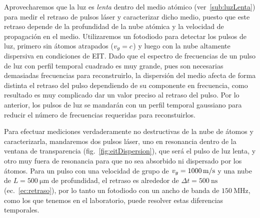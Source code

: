Aprovecharemos que la luz es \emph{lenta} dentro del medio atómico (ver~\ref{sub:luzLenta}) para medir el retraso de pulsos láser y caracterizar dicho medio, puesto que este retraso depende de la profundidad de la nube atómica y la velocidad de propagación en el medio. Utilizaremos un fotodiodo para detectar los pulsos de luz, primero sin átomos atrapados ($v_\sm{g}=c$) y luego con la nube altamente dispersiva en condiciones de EIT. Dado que el espectro de frecuencias de un pulso de luz con perfil temporal cuadrado es muy grande, pues son necesarias demasiadas frecuencias para reconstruirlo, la dispersión del medio afecta de forma distinta el retraso del pulso dependiendo de su componente en frecuencia, como resultado es muy complicado dar un valor preciso al retraso del pulso. Por lo anterior, los pulsos de luz se mandarán con un perfil temporal gaussiano para reducir el número de frecuencias requeridas para reconstuirlos.

\p Para efectuar mediciones verdaderamente no destructivas de la nube de átomos y caracterizarla, mandaremos dos pulsos láser, uno en resonancia dentro de la ventana de transparencia (fig.~\ref{fig:eitDispersion}), que será el pulso de luz lenta, y otro muy fuera de resonancia para que no sea absorbido ni dispersado por los átomos. Para un pulso con una velocidad de grupo de $v_\sm{g}=\SI[per-mode=symbol]{1000}{\meter\per\second}$ y una nube de $L=\SI{500}{\micro\meter}$ de profundidad, el retraso es alrededor de $\Delta t=\SI{500}{\nano\second}$ (ec.~\ref{ec:retraso}), por lo tanto un fotodiodo con un ancho de banda de $\SI{150}{\mega\hertz}$, como los que tenemos en el laboratorio, puede resolver estas diferencias temporales.